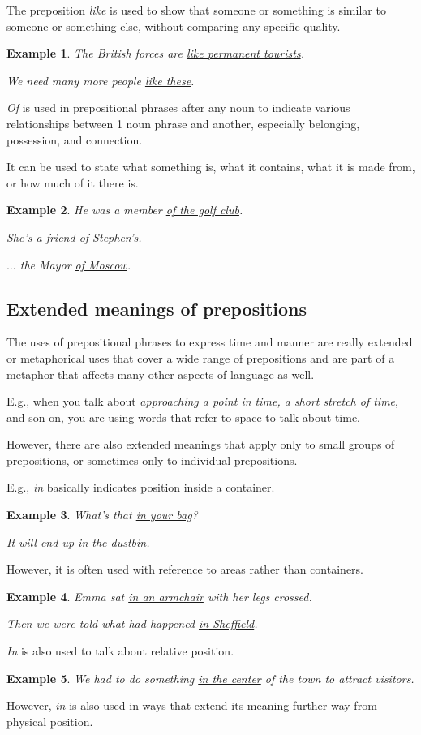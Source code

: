 \documentclass[oneside]{book}
\numberwithin{equation}{section}
\newtheorem{example}{Example}[section]
\begin{document}
%
The preposition \textit{like} is used to show that someone or something is similar to someone or something else, without comparing any specific quality.
\begin{example}
    The British forces are \underline{like permanent tourists}.
    
    We need many more people \underline{like these}.
\end{example}
%
\noindent{} \textit{Of} is used in prepositional phrases after any noun to indicate various relationships between 1 noun phrase and another, especially belonging, possession, and connection.

It can be used to state what something is, what it contains, what it is made from, or how much of it there is.
\begin{example}
    He was a member \underline{of the golf club}.
    
    She's a friend \underline{of Stephen's}.
    
    $\ldots$ the Mayor \underline{of Moscow}.
\end{example}

\subsection{Extended meanings of prepositions}
\noindent{} The uses of prepositional phrases to express time and manner are really extended or metaphorical uses that cover a wide range of prepositions and are part of a metaphor that affects many other aspects of language as well.

E.g., when you talk about \textit{approaching a point in time, a short stretch of time}, and son on, you are using words that refer to space to talk about time.

%
However, there are also extended meanings that apply only to small groups of prepositions, or sometimes only to individual prepositions.

%
E.g., \textit{in} basically indicates position inside a container.
\begin{example}
    What's that \underline{in your bag}?
    
    It will end up \underline{in the dustbin}.
\end{example}
However, it is often used with reference to areas rather than containers.
\begin{example}
    Emma sat \underline{in an armchair} with her legs crossed.
    
    Then we were told what had happened \underline{in Sheffield}.
\end{example}
\textit{In} is also used to talk about relative position.
\begin{example}
    We had to do something \underline{in the center} of the town to attract visitors.
\end{example}
However, \textit{in} is also used in ways that extend its meaning further way from physical position.
\end{document}
